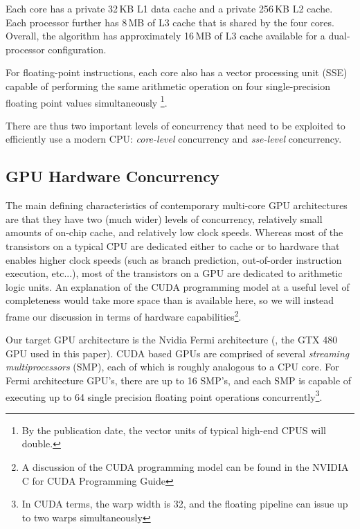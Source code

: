 \documentclass[10pt,twocolumn,letterpaper]{article}
\begin{document}
Each core has a private 32\,KB L1 data cache and a private 256\,KB L2 cache.
Each processor further has 8\,MB of L3 cache that is shared by the four cores.
Overall, the algorithm has approximately 16\,MB of L3 cache
available for a dual-processor configuration.  

For floating-point instructions, each core also has a vector processing unit
(SSE) capable of performing the same arithmetic operation on four single-precision 
floating point values simultaneously \footnote{By the publication date, the vector
units of typical high-end CPUS will double.}.  

There are thus two important levels of concurrency that need to be exploited to
efficiently use a modern CPU: {\em core-level} concurrency and {\em sse-level}
concurrency. 

\subsection{GPU Hardware Concurrency}
The main defining characteristics of contemporary multi-core GPU architectures
are that they have two (much wider) levels of concurrency, relatively small amounts of
on-chip cache, and relatively low clock speeds.  Whereas most of the transistors on
a typical CPU are dedicated either to cache or to hardware that enables higher
clock speeds (such as branch prediction, out-of-order instruction execution, etc...),
most of the transistors on a GPU are dedicated to arithmetic logic units.
An explanation of the CUDA programming model at a useful level of completeness would take 
more space than is available here, so we will instead frame our discussion in terms of 
hardware capabilities\footnote{A discussion of the CUDA programming model can be found
in the NVIDIA C for CUDA Programming Guide}.

Our target GPU architecture is the Nvidia Fermi architecture (\eg, the GTX 480
GPU used in this paper).  CUDA based GPUs are comprised of several
\emph{streaming multiprocessors} (SMP), each of which is roughly analogous to a CPU core.
For Fermi architecture GPU's, there are up to 16 SMP's, and each SMP is capable of executing up to 64 single precision 
floating point operations
concurrently\footnote{In CUDA terms, the warp width is 32, and the floating pipeline can
issue up to two warps simultaneously}. 
\end{document}
